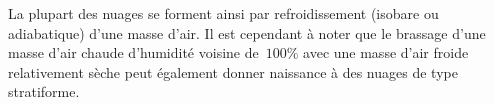 \sk
La plupart des nuages se forment ainsi par refroidissement (isobare ou adiabatique) d'une masse d'air. Il est cependant à noter que le brassage d'une masse d'air chaude d'humidité voisine de~$100\%$ avec une masse d'air froide relativement sèche peut également donner naissance à des nuages de type stratiforme. %

